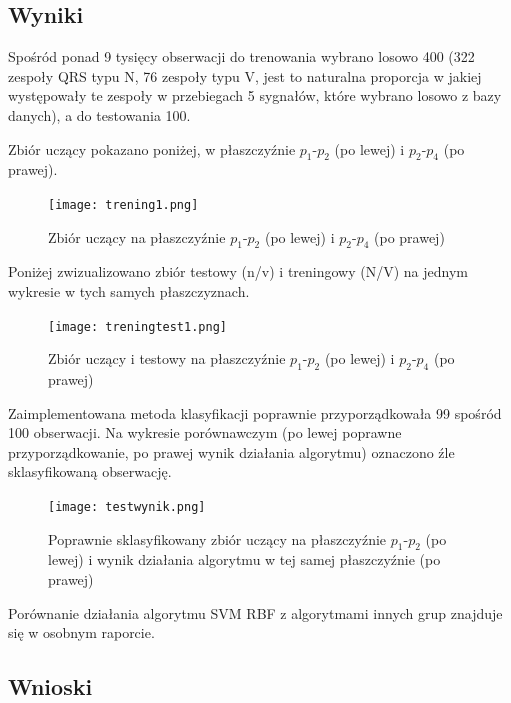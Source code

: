 \documentclass[[10pt,a4paper]{article}
\begin{document}
\subsection{Wyniki}
Spośród ponad 9 tysięcy obserwacji do trenowania wybrano losowo 400 (322 zespoły QRS typu N, 76 zespoły typu V, jest to naturalna proporcja w jakiej występowały te zespoły w przebiegach 5 sygnałów, które wybrano losowo z bazy danych), a do testowania 100.

Zbiór uczący pokazano poniżej, w płaszczyźnie $p_1$-$p_2$ (po lewej) i $p_2$-$p_4$ (po prawej).

\begin{figure}[H]
	\begin{center}
		\texttt{[image: trening1.png]}
		\caption{Zbiór uczący na płaszczyźnie $p_1$-$p_2$ (po lewej) i $p_2$-$p_4$ (po prawej)}
	\end{center}
\end{figure}


Poniżej zwizualizowano zbiór testowy (n/v) i treningowy (N/V) na jednym wykresie w tych samych płaszczyznach.

\begin{figure}[H]
	\begin{center}
		\texttt{[image: treningtest1.png]}
		\caption{Zbiór uczący i testowy na płaszczyźnie $p_1$-$p_2$ (po lewej) i $p_2$-$p_4$ (po prawej)}
	\end{center}
\end{figure}


Zaimplementowana metoda klasyfikacji poprawnie przyporządkowała 99 spośród 100 obserwacji. Na wykresie porównawczym (po lewej poprawne przyporządkowanie, po prawej wynik działania algorytmu) oznaczono źle sklasyfikowaną obserwację.

\begin{figure}[H]
	\begin{center}
		\texttt{[image: testwynik.png]}
		\caption{Poprawnie sklasyfikowany zbiór uczący na płaszczyźnie $p_1$-$p_2$ (po lewej) i wynik działania algorytmu w tej samej płaszczyźnie (po prawej)}
	\end{center}
\end{figure}

Porównanie działania algorytmu SVM RBF z algorytmami innych grup znajduje się w osobnym raporcie.

\subsection{Wnioski}
\end{document}
